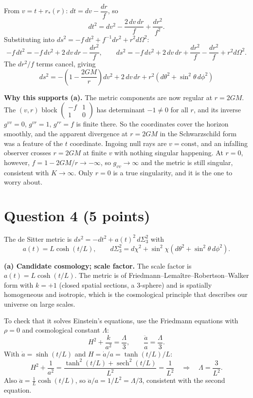\documentclass[12pt]{article}
\begin{document}
From $v=t+r_*(r)$: $dt=dv-\dfrac{dr}{f}$, so
\[
dt^2=dv^2-\frac{2\,dv\,dr}{f}+\frac{dr^2}{f^2}.
\]
Substituting into $ds^2=-f\,dt^2+f^{-1}dr^2+r^2d\Omega^2$:
\[
-f\,dt^2=-f\,dv^2+2\,dv\,dr-\frac{dr^2}{f},
\qquad
ds^2=-f\,dv^2+2\,dv\,dr+\frac{dr^2}{f}-\frac{dr^2}{f}+r^2d\Omega^2 .
\]
The $dr^2/f$ terms cancel, giving
\[
\boxed{\,ds^2=-\left(1-\frac{2GM}{r}\right)dv^2+2\,dv\,dr+r^2\left(d\theta^2+\sin^2\theta\,d\phi^2\right)\,}
\]

\textbf{Why this supports (a).} The metric components are now regular at $r=2GM$. The $(v,r)$ block $\begin{pmatrix}-f&1\\1&0\end{pmatrix}$ has determinant $-1\neq 0$ for all $r$, and its inverse $g^{vv}=0$, $g^{vr}=1$, $g^{rr}=f$ is finite there. So the coordinates cover the horizon smoothly, and the apparent divergence at $r=2GM$ in the Schwarzschild form was a feature of the $t$ coordinate. Ingoing null rays are $v=\text{const}$, and an infalling observer crosses $r=2GM$ at finite $v$ with nothing singular happening. At $r=0$, however, $f=1-2GM/r\to-\infty$, so $g_{vv}\to\infty$ and the metric is still singular, consistent with $K\to\infty$. Only $r=0$ is a true singularity, and it is the one to worry about.

\section*{Question 4 (5 points)}

The de Sitter metric is $ds^2=-dt^2+a(t)^2\,d\Sigma_3^2$ with
\[
a(t)=L\cosh(t/L),\qquad d\Sigma_3^2=d\chi^2+\sin^2\chi\left(d\theta^2+\sin^2\theta\,d\phi^2\right).
\]

\textbf{(a) Candidate cosmology; scale factor.} The scale factor is $a(t)=L\cosh(t/L)$. The metric is of Friedmann--Lema\^itre--Robertson--Walker form with $k=+1$ (closed spatial sections, a 3-sphere) and is spatially homogeneous and isotropic, which is the cosmological principle that describes our universe on large scales.

To check that it solves Einstein's equations, use the Friedmann equations with $\rho=0$ and cosmological constant $\Lambda$:
\[
H^2+\frac{k}{a^2}=\frac{\Lambda}{3},\qquad \frac{\ddot a}{a}=\frac{\Lambda}{3}.
\]
With $\dot a=\sinh(t/L)$ and $H=\dot a/a=\tanh(t/L)/L$:
\[
H^2+\frac{1}{a^2}=\frac{\tanh^2(t/L)+\operatorname{sech}^2(t/L)}{L^2}=\frac{1}{L^2}\quad\Rightarrow\quad\Lambda=\frac{3}{L^2}.
\]
Also $\ddot a=\frac{1}{L}\cosh(t/L)$, so $\ddot a/a=1/L^2=\Lambda/3$, consistent with the second equation.
\end{document}
